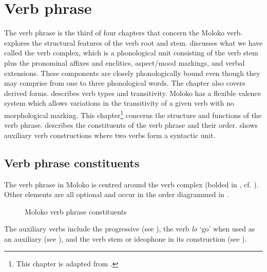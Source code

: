 \chapter[Verb phrase]{Verb phrase}\label{chap:8}
\hypertarget{RefHeading1212501525720847}{}
The verb phrase is the third of four chapters that concern the Moloko verb.  explores the structural features of the verb root and stem.  discusses what we have called the verb complex, which is a phonological unit consisting of the verb stem plus the pronominal affixes and enclitics, aspect/mood markings, and verbal extensions. These components are closely phonologically bound even though they may comprise from one to three phonological words. The chapter also covers derived forms.  describes verb types and transitivity. Moloko has a flexible valence system which allows variations in the transitivity of a given verb with no morphological marking. This chapter\footnote{This chapter is adapted from \citet{FriesenMamalis2008}.} concerns the structure and functions of the verb phrase.  describes the constituents of the verb phrase and their order.  shows auxiliary verb constructions where two verbs form a syntactic unit. 

\section{Verb phrase constituents}\label{sec:8.1}
\hypertarget{RefHeading1212521525720847}{}
The verb phrase in Moloko is centred around the verb complex (bolded in , cf. ).  Other elements are all optional and occur in the order diagrammed in . 

\begin{figure}
\caption{Moloko verb phrase constituents\label{fig:15}}\end{figure}

The auxiliary verbs include the progressive (see ), the verb \textit{l}\textit{o} ‘go’ when used as an auxiliary (see ), and the verb stem or ideophone in its construction (see ). 

